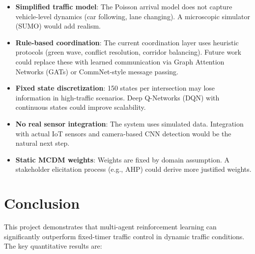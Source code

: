\documentclass[12pt, a4paper]{article}
\begin{document}
\begin{itemize}[nosep]
    \item \textbf{Simplified traffic model}: The Poisson arrival model does not capture vehicle-level dynamics (car following, lane changing). A microscopic simulator (SUMO) would add realism.
    \item \textbf{Rule-based coordination}: The current coordination layer uses heuristic protocols (green wave, conflict resolution, corridor balancing). Future work could replace these with learned communication via Graph Attention Networks (GATs) or CommNet-style message passing.
    \item \textbf{Fixed state discretization}: 150 states per intersection may lose information in high-traffic scenarios. Deep Q-Networks (DQN) with continuous states could improve scalability.
    \item \textbf{No real sensor integration}: The system uses simulated data. Integration with actual IoT sensors and camera-based CNN detection would be the natural next step.
    \item \textbf{Static MCDM weights}: Weights are fixed by domain assumption. A stakeholder elicitation process (e.g., AHP) could derive more justified weights.
\end{itemize}

\section{Conclusion}

This project demonstrates that multi-agent reinforcement learning can significantly outperform fixed-timer traffic control in dynamic traffic conditions. The key quantitative results are:
\end{document}
